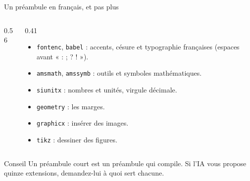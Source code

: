 \begin{frame}[fragile]{Un préambule en français, et pas plus}
  \begin{columns}[c]
    \begin{column}{0.56\textwidth}
\begin{CodeTeX}[title={Le préambule de nos exemples}]
\usepackage[T1]{fontenc}
\usepackage[french]{babel}
\usepackage{amsmath, amssymb}
\usepackage{siunitx}
\usepackage[margin=2.5cm]{geometry}
\usepackage{graphicx}
\usepackage{tikz}
\end{CodeTeX}
    \end{column}
    \begin{column}{0.41\textwidth}
      \footnotesize
      \begin{itemize}
        \item \texttt{fontenc}, \texttt{babel} : accents, césure et
          typographie françaises (espaces avant « : ; ? ! »).
        \item \texttt{amsmath}, \texttt{amssymb} : outils et symboles
          mathématiques.
        \item \texttt{siunitx} : nombres et unités, virgule décimale.
        \item \texttt{geometry} : les marges.
        \item \texttt{graphicx} : insérer des images.
        \item \texttt{tikz} : dessiner des figures.
      \end{itemize}
    \end{column}
  \end{columns}
  \vspace{4pt}
  \begin{Rem}{Conseil}
    \small Un préambule court est un préambule qui compile. Si l'IA vous
    propose quinze extensions, demandez-lui à quoi sert chacune.
  \end{Rem}
\end{frame}

